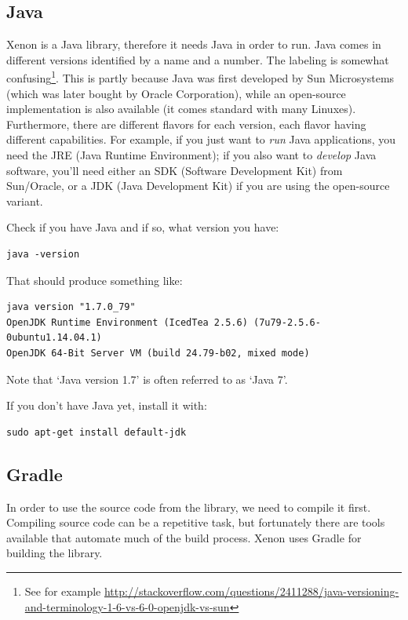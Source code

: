 \documentclass[12pt, a4paper, twoside,openany,titlepage]{article}
\begin{document}
\subsection{Java}

Xenon is a Java library, therefore it needs Java in order to run. Java comes in different versions identified by a name and a number. The labeling is somewhat confusing\footnote{See for example \url{http://stackoverflow.com/questions/2411288/java-versioning-and-terminology-1-6-vs-6-0-openjdk-vs-sun}}. This is partly because Java was first developed by Sun Microsystems (which was later bought by Oracle Corporation), while an open-source implementation is also available (it comes standard with many Linuxes). Furthermore, there are different flavors for each version, each flavor having different capabilities. For example, if you just want to \textit{run} Java applications, you need the JRE (Java Runtime Environment); if you also want to \textit{develop} Java software, you'll need either an SDK (Software Development Kit) from Sun/Oracle, or a JDK (Java Development Kit) if you are using the open-source variant.

Check if you have Java and if so, what version you have:
\begin{lstlisting}[style=basic,style=bash]
java -version
\end{lstlisting}
That should produce something like:
\begin{lstlisting}[style=basic,style=bash]
java version "1.7.0_79"
OpenJDK Runtime Environment (IcedTea 2.5.6) (7u79-2.5.6-0ubuntu1.14.04.1)
OpenJDK 64-Bit Server VM (build 24.79-b02, mixed mode)
\end{lstlisting}
Note that `Java version 1.7' is often referred to as `Java 7'.

If you don't have Java yet, install it with:
\begin{lstlisting}[style=basic,style=bash]
sudo apt-get install default-jdk
\end{lstlisting}


\subsection{Gradle}

In order to use the source code from the library, we need to compile it first. Compiling source code can be a repetitive task, but fortunately there are tools available that automate much of the build process. Xenon uses Gradle for building the library.
\end{document}
